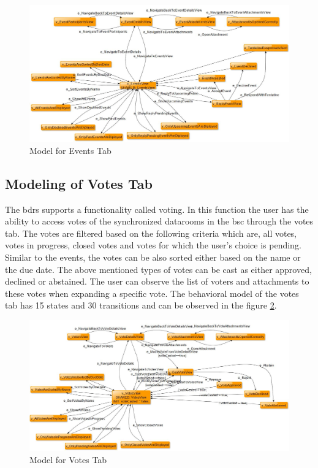 \begin{figure} [htbp!]
	\centering
					\includegraphics[width=1\textwidth]{figures/Events_model_screenshot}
					\caption{\label{Fig:Events_Model_Screenshot} Model for Events Tab}
\end{figure}

\subsection{Modeling of Votes Tab}
\par
The \acrshort{bdrs} supports a functionality called voting. In this function the user has the ability to access votes of the synchronized datarooms in the \acrshort{bsc} through the votes tab. The votes are filtered based on the following criteria which are, all votes, votes in progress, closed votes and votes for which the user's choice is pending. Similar to the events, the votes can be also sorted either based on the name or the due date. The above mentioned types of votes can be cast as either approved, declined or abstained. The user can observe the list of voters and attachments to these votes when expanding a specific vote. The behavioral model of the votes tab has 15 states and 30 transitions and can be observed in the figure \ref{Fig:Votes_Model_Screenshot}.

\begin{figure} [htbp!]
	\centering
					\includegraphics[width=1\textwidth]{figures/Votes_model_screenshot}
					\caption{\label{Fig:Votes_Model_Screenshot} Model for Votes Tab}
\end{figure}

